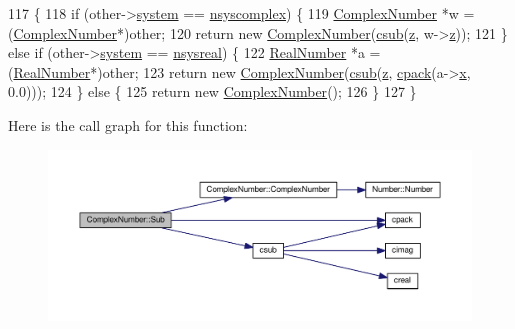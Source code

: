 \begin{DoxyCode}
117 \{
118     \textcolor{keywordflow}{if} (other->\hyperlink{structNumber_a2ceda5601c42288626e76b06878e7476}{system} == \hyperlink{numb_8h_a1475a201d2346881ce88dfbacf628c7da3b38c947375a3db3a4bc184a11c8ee42}{nsyscomplex}) \{
119         \hyperlink{structComplexNumber}{ComplexNumber} *w = (\hyperlink{structComplexNumber}{ComplexNumber}*)other;
120         \textcolor{keywordflow}{return} \textcolor{keyword}{new} \hyperlink{structComplexNumber_a610e9db9ff0ddb0140e30d235ab64e44}{ComplexNumber}(\hyperlink{complex_8h_a46bb0dd64d87c3aeb85417d1dadf6ddd}{csub}(\hyperlink{structComplexNumber_a5f72da71f4ce0d88076a391369239042}{z}, w->\hyperlink{structComplexNumber_a5f72da71f4ce0d88076a391369239042}{z}));
121     \} \textcolor{keywordflow}{else}  \textcolor{keywordflow}{if} (other->\hyperlink{structNumber_a2ceda5601c42288626e76b06878e7476}{system} == \hyperlink{numb_8h_a1475a201d2346881ce88dfbacf628c7dae72cf8673109b15268d1c0837e8bff86}{nsysreal}) \{
122         \hyperlink{structRealNumber}{RealNumber} *a = (\hyperlink{structRealNumber}{RealNumber}*)other;
123         \textcolor{keywordflow}{return} \textcolor{keyword}{new} \hyperlink{structComplexNumber_a610e9db9ff0ddb0140e30d235ab64e44}{ComplexNumber}(\hyperlink{complex_8h_a46bb0dd64d87c3aeb85417d1dadf6ddd}{csub}(\hyperlink{structComplexNumber_a5f72da71f4ce0d88076a391369239042}{z}, \hyperlink{complex_8h_a980e6e049f7902b05fc9eb5614b07a5c}{cpack}(a->\hyperlink{structRealNumber_ac33d80bee75448490199a0aa48ccce1e}{x}, 0.0)));
124     \} \textcolor{keywordflow}{else} \{
125         \textcolor{keywordflow}{return} \textcolor{keyword}{new} \hyperlink{structComplexNumber_a610e9db9ff0ddb0140e30d235ab64e44}{ComplexNumber}();
126     \}
127 \}
\end{DoxyCode}


Here is the call graph for this function\+:
\nopagebreak
\begin{figure}[H]
\begin{center}
\leavevmode
\includegraphics[width=350pt]{db/d8e/structComplexNumber_a8f196f990620e30495f69338a1e40316_cgraph}
\end{center}
\end{figure}



